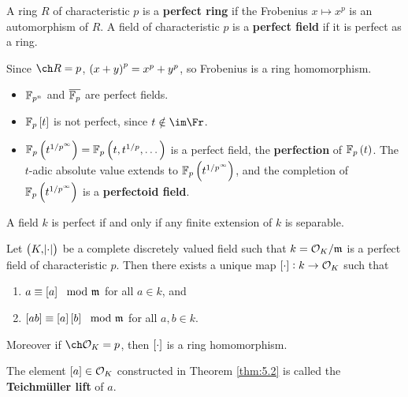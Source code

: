 \begin{definition}
A ring $ R $ of characteristic $ p $ is a \textbf{perfect ring} if the Frobenius $ x \mapsto x^p $ is an automorphism of $ R $. A field of characteristic $ p $ is a \textbf{perfect field} if it is perfect as a ring.
\end{definition}

\begin{remark*}
Since $ \ch R = p $, $ \br{x + y}^p = x^p + y^p $, so Frobenius is a ring homomorphism.
\end{remark*}

\begin{example*}
\hfill
\begin{itemize}
\item $ \mathbb{F}_{p^n} $ and $ \overline{\mathbb{F}_p} $ are perfect fields.
\item $ \FF_p\sbr{t} $ is not perfect, since $ t \notin \im \Fr $.
\item $ \FF_p\br{t^{1 / p^\infty}} = \FF_p\br{t, t^{1 / p}, \dots} $ is a perfect field, the \textbf{perfection} of $ \FF_p\br{t} $. The $ t $-adic absolute value extends to $ \FF_p\br{t^{1 / p^\infty}} $, and the completion of $ \FF_p\br{t^{1 / p^\infty}} $ is a \textbf{perfectoid field}.
\end{itemize}
\end{example*}

\begin{fact*}
A field $ k $ is perfect if and only if any finite extension of $ k $ is separable.
\end{fact*}

\pagebreak

\begin{theorem}
\label{thm:5.2}
Let $ \br{K, \abs{\cdot}} $ be a complete discretely valued field such that $ k = \mathcal{O}_K / \mathfrak{m} $ is a perfect field of characteristic $ p $. Then there exists a unique map $ \sbr{\cdot} : k \to \OOO_K $ such that
\begin{enumerate}
\item $ a \equiv \sbr{a} \mod \mmm $ for all $ a \in k $, and
\item $ \sbr{ab} \equiv \sbr{a}\sbr{b} \mod \mmm $ for all $ a, b \in k $.
\end{enumerate}
Moreover if $ \ch \OOO_K = p $, then $ \sbr{\cdot} $ is a ring homomorphism.
\end{theorem}

\begin{definition}
The element $ \sbr{a} \in \OOO_K $ constructed in Theorem \ref{thm:5.2} is called the \textbf{Teichm\"uller lift} of $ a $.
\end{definition}

